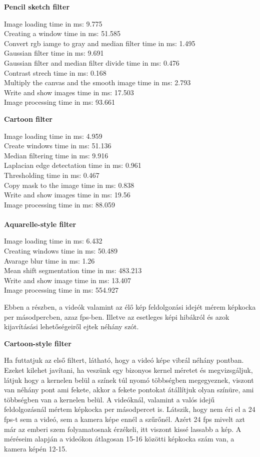 \textbf{Pencil sketch filter}

Image loading time in ms: 9.775\\
Creating a window time in ms: 51.585\\
Convert rgb iamge to gray and median filter time in ms: 1.495\\
Gaussian filter time in ms: 9.691\\
Gaussian filter and median filter divide time in ms: 0.476\\
Contrast strech time in ms: 0.168\\
Multiply the canvas and the smooth image time in ms: 2.793\\
Write and show images time in ms: 17.503\\
Image processing time in ms: 93.661

\textbf{Cartoon filter}

Image loading time in ms: 4.959\\
Create windows time in ms: 51.136\\
Median filtering time in ms: 9.916\\
Laplacian edge detectation time in ms: 0.961\\
Thresholding time in ms: 0.467\\
Copy mask to the image time in ms: 0.838\\
Write and show images time in ms: 19.56\\
Image processing time in ms: 88.059\\\\

\textbf{Aquarelle-style filter}

Image loading time in ms: 6.432\\
Creating windows time in ms: 50.489\\
Avarage blur time in ms: 1.26\\
Mean shift segmentation time in ms: 483.213\\
Write and show image time in ms: 13.407\\
Image processing time in ms: 554.927


Ebben a részben, a videók valamint az élő kép feldolgozási idejét mérem képkocka per másodpercben, azaz fps-ben. Illetve az esetleges képi hibákról és azok kijavításási lehetőségeiről ejtek néhány szót.

\textbf{Cartoon-style filter}

Ha futtatjuk az első filtert, látható, hogy a videó képe vibrál néhány pontban. Ezeket kilehet javítani, ha veszünk egy bizonyos kernel méretet és megvizsgáljuk, látjuk hogy a kernelen belül a színek túl nyomó többségben megegyeznek, viszont van néhány pont ami fekete, akkor a fekete pontokat átállítjuk olyan színüre, ami többségben van a kernelen belül. A videóknál, valamint a valós idejű feldolgozásnál mértem képkocka per másodpercet is. Látszik, hogy nem éri el a 24 fps-t sem a videó, sem a kamera képe ennél a szűrőnél. Azért 24 fps mivelt azt már az emberi szem folyamatosnak érzékeli, itt viszont kissé lassabb a kép. A méréseim alapján a videókon átlagosan 15-16 közötti képkocka szám van, a kamera képén 12-15.

